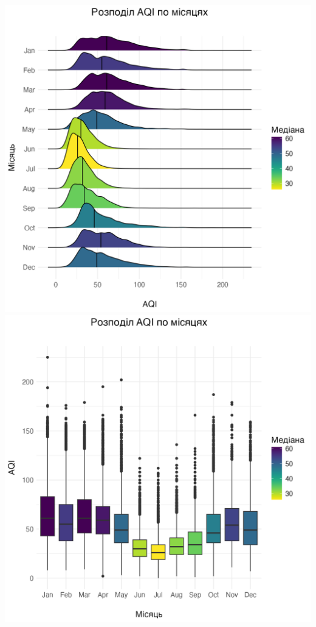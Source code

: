 \documentclass{article}
\begin{document}
\begin{enumerate}
    \begin{center}
    \includegraphics[width=6in]{plots/question4/seasonal_change_ridgeline.png}
    \includegraphics[width=6in]{plots/question4/seasonal_change.png}
    \end{center} 


\end{enumerate}
\end{document}
